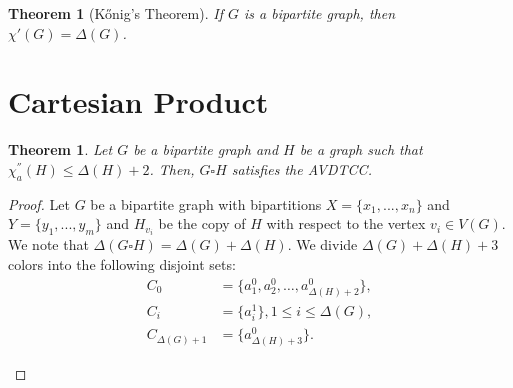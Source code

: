 \documentclass[12pt]{article}
\theoremstyle{definition}
\newtheorem{thm}[defn]{Theorem}
\begin{document}
\begin{thm}[K\H{o}nig's Theorem]\label{Theorem 2.3}
{\em If $G$ is a bipartite graph, then $\chi'(G) = \Delta(G)$.}
\end{thm}

\section{Cartesian Product}

\begin{thm}\label{Theorem 3.1}
    {\em Let $G$ be a bipartite graph and $H$ be a graph such that $\chi^{''}_{a}(H)\leq \Delta(H)+2$. Then, $G\square H$ satisfies the AVDTCC.}
\end{thm}

\begin{proof}
Let $G$ be a bipartite graph with bipartitions $X=\{x_1,...,x_n\}$ and $Y=\{y_1,...,y_m\}$
and $H_{v_i}$ be the copy of $H$ with respect to the vertex $v_i\in V(G)$. We note that $\Delta(G\square H)=\Delta(G)+\Delta(H)$. We divide $\Delta(G)+\Delta(H)+3$ colors into the following disjoint sets:
\begin{align*}
C_0 &= \{a_1^0, a_2^0, \dots, a_{\Delta(H)+2}^0\}, \\
C_i &= \{a_i^1\}, 1\leq i\leq \Delta(G),\\
C_{\Delta(G)+1} &= \{a_{\Delta(H)+3}^0\}.
\end{align*}

\begin{figure}[ht]
    \centering
\end{figure}
\end{proof}
\end{document}
